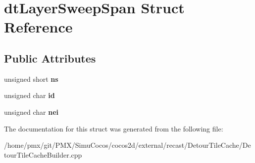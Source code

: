 \hypertarget{structdtLayerSweepSpan}{}\section{dt\+Layer\+Sweep\+Span Struct Reference}
\label{structdtLayerSweepSpan}
\subsection*{Public Attributes}
\begin{DoxyCompactItemize}
\item 
\mbox{\label{structdtLayerSweepSpan_a20068e1afedf77184348891cc3f863ed}} 
unsigned short {\bfseries ns}
\item 
\mbox{\label{structdtLayerSweepSpan_a979ef3d0c22d55844358ed2e62acd83f}} 
unsigned char {\bfseries id}
\item 
\mbox{\label{structdtLayerSweepSpan_abbd4307e791bd3ff4bd19bf13990c694}} 
unsigned char {\bfseries nei}
\end{DoxyCompactItemize}


The documentation for this struct was generated from the following file\+:\begin{DoxyCompactItemize}
\item 
/home/pmx/git/\+P\+M\+X/\+Simu\+Cocos/cocos2d/external/recast/\+Detour\+Tile\+Cache/Detour\+Tile\+Cache\+Builder.\+cpp\end{DoxyCompactItemize}
